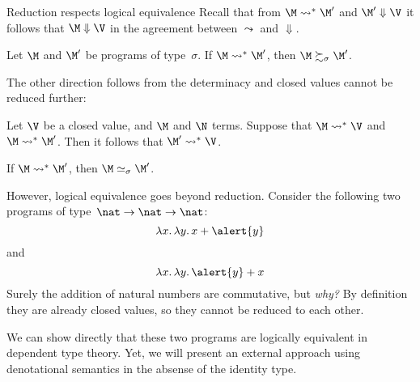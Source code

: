 \begin{frame}{Reduction respects logical equivalence}
  Recall that from $\M \leadsto^* \M'$ and $\M' \Downarrow \V$
  it follows that $\M \Downarrow \V$ in the agreement between $\leadsto$ and
  $\Downarrow$. 
  \begin{proposition}
    Let $\M$ and $\M'$ be programs of type~$\sigma$. 
    If $\M \leadsto^* \M'$, then $\M \succsim_\sigma \M'$. 
  \end{proposition}
  The other direction follows from the determinacy and closed values cannot be
  reduced further:
  \begin{proposition}
    Let $\V$ be a closed value, and $\M$ and $\N$ terms. 
    Suppose that $\M \leadsto^* \V$ and $\M \leadsto^* \M'$. Then it follows that
    $\M' \leadsto^* \V$. 
  \end{proposition}
  \begin{corollary}
    If $\M \leadsto^* \M'$, then $\M \simeq_\sigma \M'$. 
  \end{corollary}
\end{frame}
\begin{frame}
  However, logical equivalence goes beyond reduction.  
  Consider the following two programs of type~$\nat\to\nat\to\nat$:
    \[
      \lambda x.\, \lambda y.\, x + \alert{y}
    \]
    and 
    \[
      \lambda x.\, \lambda y.\, \alert{y} + x
    \]
    Surely the addition of natural numbers are commutative, but \emph{why?}
    By definition they are already closed values, so they cannot be reduced to
    each other. 
    \begin{remark}
      We can show directly that these two programs are logically
      equivalent in dependent type theory. Yet, we will present an external
      approach using denotational semantics in the absense of
      the identity type. 
    \end{remark}
\end{frame}

